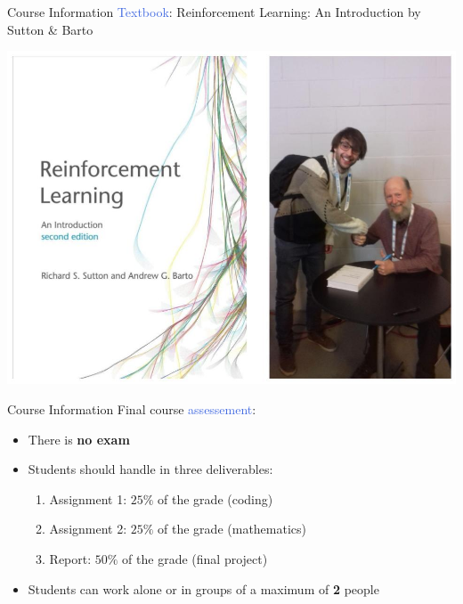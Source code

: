 \documentclass{beamer}
\begin{document}
\begin{frame}{Course Information}
	\textcolor{RoyalBlue}{Textbook}: Reinforcement Learning: An Introduction by Sutton \& Barto

	\centering
	\includegraphics[scale=0.25]{./images/sutton_pic}

\end{frame}

\begin{frame}{Course Information}
	Final course \textcolor{RoyalBlue}{assessement}:
	\begin{itemize}
		\item There is \textbf{no exam}
		\item Students should handle in three deliverables:
			\begin{enumerate}
				\item Assignment 1: $25\%$ of the grade (coding)
				\item Assignment 2: $25\%$ of the grade (mathematics)
				\item Report: $50\%$ of the grade (final project)
			\end{enumerate}
		\item Students can work alone or in groups of a maximum of \textbf{2} people 
	\end{itemize}

\end{frame}

\end{document}
